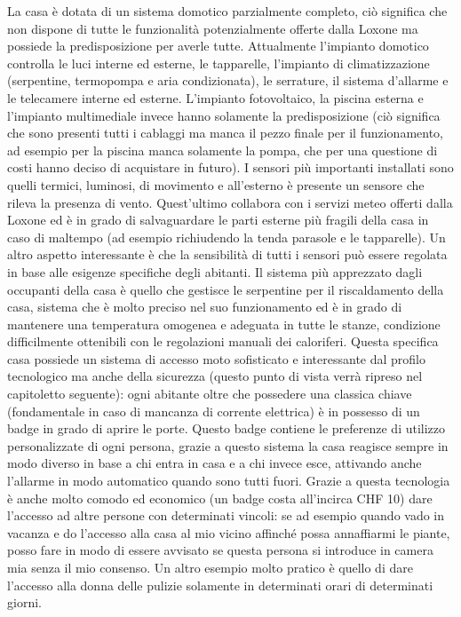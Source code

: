 La casa è dotata di un sistema domotico parzialmente completo, ciò significa che non dispone di tutte le funzionalità potenzialmente offerte dalla Loxone ma possiede la predisposizione per averle tutte. Attualmente l’impianto domotico controlla le luci interne ed esterne, le tapparelle, l’impianto di climatizzazione (serpentine, termopompa e aria condizionata), le serrature, il sistema d’allarme e le telecamere interne ed esterne. L’impianto fotovoltaico, la piscina esterna e l’impianto multimediale invece hanno solamente la predisposizione (ciò significa che sono presenti tutti i cablaggi ma manca il pezzo finale per il funzionamento, ad esempio per la piscina manca solamente la pompa, che per una questione di costi hanno deciso di acquistare in futuro). I sensori più importanti installati sono quelli termici, luminosi, di movimento e all’esterno è presente un sensore che rileva la presenza di vento. Quest’ultimo collabora con i servizi meteo offerti dalla Loxone ed è in grado di salvaguardare le parti esterne più fragili della casa in caso di maltempo (ad esempio richiudendo la tenda parasole e le tapparelle). Un altro aspetto interessante è che la sensibilità di tutti i sensori può essere regolata in base alle esigenze specifiche degli abitanti. Il sistema più apprezzato dagli occupanti della casa è quello che gestisce le serpentine per il riscaldamento della casa, sistema che è molto preciso nel suo funzionamento ed è in grado di mantenere una temperatura omogenea e adeguata in tutte le stanze, condizione difficilmente ottenibili con le regolazioni manuali dei caloriferi.
Questa specifica casa possiede un sistema di accesso moto sofisticato e interessante dal profilo tecnologico ma anche della sicurezza (questo punto di vista verrà ripreso nel capitoletto seguente): ogni abitante oltre che possedere una classica chiave (fondamentale in caso di mancanza di corrente elettrica) è in possesso di un badge in grado di aprire le porte. Questo badge contiene le preferenze di utilizzo personalizzate di ogni persona, grazie a questo sistema la casa reagisce sempre in modo diverso in base a chi entra in casa e a chi invece esce, attivando anche l’allarme in modo automatico quando sono tutti fuori. Grazie a questa tecnologia è anche molto comodo ed economico (un badge costa all’incirca CHF 10) dare l’accesso ad altre persone con determinati vincoli: se ad esempio quando vado in vacanza e do l’accesso alla casa al mio vicino affinché possa annaffiarmi le piante, posso fare in modo di essere avvisato se questa persona si introduce in camera mia senza il mio consenso. Un altro esempio molto pratico è quello di dare l’accesso alla donna delle pulizie solamente in determinati orari di determinati giorni.
